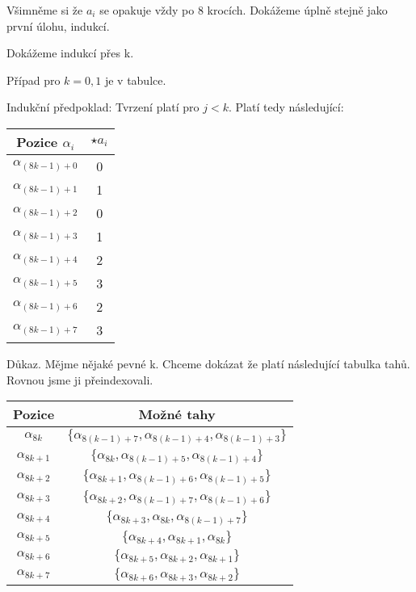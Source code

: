 \documentclass[../main.tex]{subfiles}
\begin{document}
Všimněme si že $a_i$ se opakuje vždy po 8 krocích. Dokážeme úplně stejně jako první úlohu, indukcí.

Dokážeme indukcí přes k.

Případ pro $k=0,1$ je v tabulce. 

Indukční předpoklad: 
Tvrzení platí pro $j<k$. Platí tedy následující: 
\begin{center}
    \begin{tabular}{|c|c|}
        \hline
        Pozice $\alpha_i$ & $\star a_i$\\
        \hline
        $\alpha_{(8k-1)+0}$ & 0  \\
        \hline
        $\alpha_{(8k-1)+1}$ & 1 \\
        \hline
        $\alpha_{(8k-1)+2}$ & 0  \\
        \hline
        $\alpha_{(8k-1)+3}$ & 1 \\
        \hline
        $\alpha_{(8k-1)+4}$ & 2  \\
        \hline
        $\alpha_{(8k-1)+5}$ & 3 \\
        \hline
        $\alpha_{(8k-1)+6}$ & 2  \\
        \hline
        $\alpha_{(8k-1)+7}$ & 3 \\
        \hline
    \end{tabular}

\end{center}


Důkaz. Mějme nějaké pevné k. Chceme dokázat že platí následující tabulka tahů. Rovnou jsme ji přeindexovali.

\begin{center}
    \begin{tabular}{|c|c|}
        \hline
        Pozice &  Možné tahy \\
        \hline
        $\alpha_{8k}$ & $\{ \alpha_{8(k-1)+7},  \alpha_{8(k-1)+4}, \alpha_{8(k-1)+3} \}$ \\
        \hline
        $\alpha_{8k+1}$  & $\{ \alpha_{8k},  \alpha_{8(k-1)+5}, \alpha_{8(k-1)+4} \}$ \\
        \hline
        $\alpha_{8k+2}$ & $\{ \alpha_{8k+1},  \alpha_{8(k-1)+6}, \alpha_{8(k-1)+5} \}$ \\
        \hline
        $\alpha_{8k+3}$  & $\{ \alpha_{8k+2},  \alpha_{8(k-1)+7}, \alpha_{8(k-1)+6} \}$ \\
        \hline
        $\alpha_{8k+4}$  & $\{ \alpha_{8k+3},  \alpha_{8k}, \alpha_{8(k-1)+7} \}$ \\
        \hline
        $\alpha_{8k+5}$  & $\{ \alpha_{8k+4},  \alpha_{8k+1}, \alpha_{8k} \}$ \\
        \hline
        $\alpha_{8k+6}$  & $\{ \alpha_{8k+5},  \alpha_{8k+2}, \alpha_{8k+1} \}$ \\
        \hline
        $\alpha_{8k+7}$ & $\{ \alpha_{8k+6},  \alpha_{8k+3}, \alpha_{8k+2} \}$ \\
        \hline
    \end{tabular}

\end{center}
\end{document}
